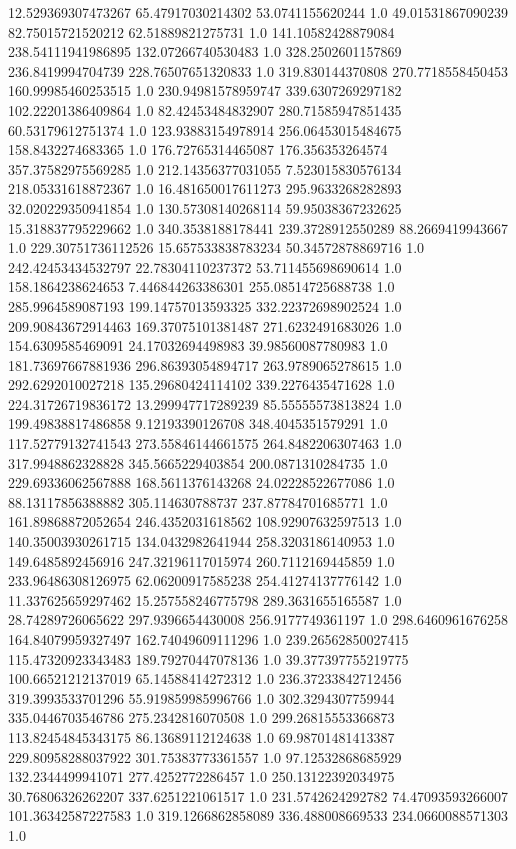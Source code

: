 12.529369307473267	65.47917030214302	53.0741155620244	1.0
49.01531867090239	82.75015721520212	62.51889821275731	1.0
141.10582428879084	238.54111941986895	132.07266740530483	1.0
328.2502601157869	236.8419994704739	228.76507651320833	1.0
319.830144370808	270.7718558450453	160.99985460253515	1.0
230.94981578959747	339.6307269297182	102.22201386409864	1.0
82.42453484832907	280.71585947851435	60.53179612751374	1.0
123.93883154978914	256.06453015484675	158.8432274683365	1.0
176.72765314465087	176.356353264574	357.37582975569285	1.0
212.14356377031055	7.523015830576134	218.05331618872367	1.0
16.481650017611273	295.9633268282893	32.020229350941854	1.0
130.57308140268114	59.95038367232625	15.318837795229662	1.0
340.3538188178441	239.3728912550289	88.2669419943667	1.0
229.30751736112526	15.657533838783234	50.34572878869716	1.0
242.42453434532797	22.78304110237372	53.711455698690614	1.0
158.1864238624653	7.446844263386301	255.08514725688738	1.0
285.9964589087193	199.14757013593325	332.22372698902524	1.0
209.90843672914463	169.37075101381487	271.6232491683026	1.0
154.6309585469091	24.17032694498983	39.98560087780983	1.0
181.73697667881936	296.86393054894717	263.9789065278615	1.0
292.6292010027218	135.29680424114102	339.2276435471628	1.0
224.31726719836172	13.299947717289239	85.55555573813824	1.0
199.49838817486858	9.12193390126708	348.4045351579291	1.0
117.52779132741543	273.55846144661575	264.8482206307463	1.0
317.9948862328828	345.5665229403854	200.0871310284735	1.0
229.69336062567888	168.5611376143268	24.02228522677086	1.0
88.13117856388882	305.114630788737	237.87784701685771	1.0
161.89868872052654	246.4352031618562	108.92907632597513	1.0
140.35003930261715	134.0432982641944	258.3203186140953	1.0
149.6485892456916	247.32196117015974	260.7112169445859	1.0
233.96486308126975	62.06200917585238	254.41274137776142	1.0
11.337625659297462	15.257558246775798	289.3631655165587	1.0
28.74289726065622	297.9396654430008	256.9177749361197	1.0
298.6460961676258	164.84079959327497	162.74049609111296	1.0
239.26562850027415	115.47320923343483	189.79270447078136	1.0
39.377397755219775	100.66521212137019	65.14588414272312	1.0
236.37233842712456	319.3993533701296	55.919859985996766	1.0
302.3294307759944	335.0446703546786	275.2342816070508	1.0
299.26815553366873	113.82454845343175	86.13689112124638	1.0
69.98701481413387	229.80958288037922	301.75383773361557	1.0
97.12532868685929	132.2344499941071	277.4252772286457	1.0
250.13122392034975	30.76806326262207	337.6251221061517	1.0
231.5742624292782	74.47093593266007	101.36342587227583	1.0
319.1266862858089	336.488008669533	234.0660088571303	1.0

